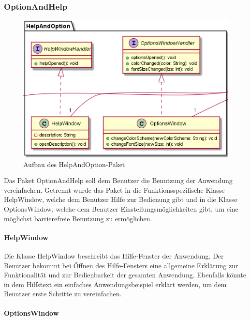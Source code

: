 \documentclass[parskip=full]{scrartcl}
\begin{document}
\subsubsection{OptionAndHelp}

\begin{figure}[htbp]
	\begin{center}
		\includegraphics[width = 14cm]{Grafiken/View/HelpAndOptionNamespace.png}
		\caption{Aufbau des HelpAndOption-Paket}
		\label{Entwurf_Grob}
	\end{center}
\end{figure}

Das Paket OptionAndHelp soll dem Benutzer die Benutzung der Anwendung vereinfachen. Getrennt wurde das Paket in die Funktionsspezifische Klasse HelpWindow, welche dem Benutzer Hilfe zur Bedienung gibt und in die Klasse OptionsWindow, welche dem Benutzer Einstellungsmöglichkeiten gibt, um eine möglichst barrierefreie Benutzung zu ermöglichen.

\paragraph{HelpWindow}

Die Klasse HelpWindow beschreibt das Hilfe-Fenster der Anwendung. Der Benutzer bekommt bei Öffnen des Hilfe-Fensters eine allgemeine Erklärung zur Funktionalität und zur Bedienbarkeit der gesamten Anwendung. Ebenfalls könnte in dem Hilfstext ein einfaches Anwendungsbeispiel erklärt werden, um dem Benutzer erste Schritte zu vereinfachen.

\paragraph{OptionsWindow}
\end{document}

